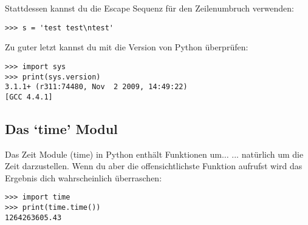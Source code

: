 Stattdessen kannst du die Escape Sequenz für den Zeilenumbruch verwenden:
\begin{Verbatim}[frame=single]
>>> s = 'test test\ntest'
\end{Verbatim}

\noindent
Zu guter letzt kannst du mit  die Version von Python überprüfen:

\begin{Verbatim}[frame=single]
>>> import sys
>>> print(sys.version)
3.1.1+ (r311:74480, Nov  2 2009, 14:49:22) 
[GCC 4.4.1]
\end{Verbatim}

\subsection*{Das `time' Modul}

Das Zeit Module (time) in Python enthält Funktionen um$\ldots$ ... natürlich um die Zeit darzustellen. Wenn du aber die offensichtlichste Funktion  aufrufst wird das Ergebnis dich wahrscheinlich überraschen:

\begin{Verbatim}[frame=single]
>>> import time
>>> print(time.time())
1264263605.43
\end{Verbatim}


